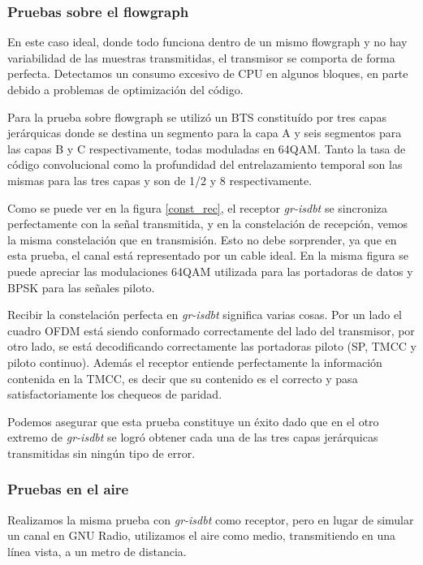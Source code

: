 \documentclass[journal,comsoc]{IEEEtran}
\begin{document}
\subsubsection{Pruebas sobre el flowgraph}

En este caso ideal, donde todo funciona dentro de un mismo flowgraph y no hay variabilidad de las muestras transmitidas, el transmisor se comporta de forma perfecta. Detectamos un consumo excesivo de CPU en algunos bloques, en parte debido a problemas de optimización del código.

Para la prueba sobre flowgraph se utilizó un BTS constituído por tres capas jerárquicas donde se destina un segmento para la capa A y seis segmentos para las capas B y C respectivamente, todas moduladas en 64QAM. Tanto la tasa de código convolucional como la profundidad del entrelazamiento temporal son las mismas para las tres capas y son de 1/2 y 8 respectivamente.

Como se puede ver en la figura \ref{const_rec}, el receptor \textit{gr-isdbt} se sincroniza perfectamente con la señal transmitida, y en la constelación de recepción, vemos la misma constelación que en transmisión. Esto no debe sorprender, ya que en esta prueba, el canal está representado por un cable ideal. En la misma figura se puede apreciar las modulaciones 64QAM utilizada para las portadoras de datos y BPSK para las señales piloto. 

Recibir la constelación perfecta en \textit{gr-isdbt} significa varias cosas. Por un lado el cuadro OFDM está siendo conformado correctamente del lado del transmisor, por otro lado, se está decodificando correctamente las portadoras piloto (SP, TMCC y piloto continuo). Además el receptor entiende perfectamente la información contenida en la TMCC, es decir que su contenido es el correcto y pasa satisfactoriamente los chequeos de paridad.

Podemos asegurar que esta prueba constituye un éxito dado que en el otro extremo de \textit{gr-isdbt} se logró obtener cada una de las tres capas jerárquicas transmitidas sin ningún tipo de error.

\subsubsection{Pruebas en el aire}

Realizamos la misma prueba con \textit{gr-isdbt} como receptor, pero en lugar de simular un canal en GNU Radio, utilizamos el aire como medio, transmitiendo en una línea vista, a un metro de distancia.
\end{document}
